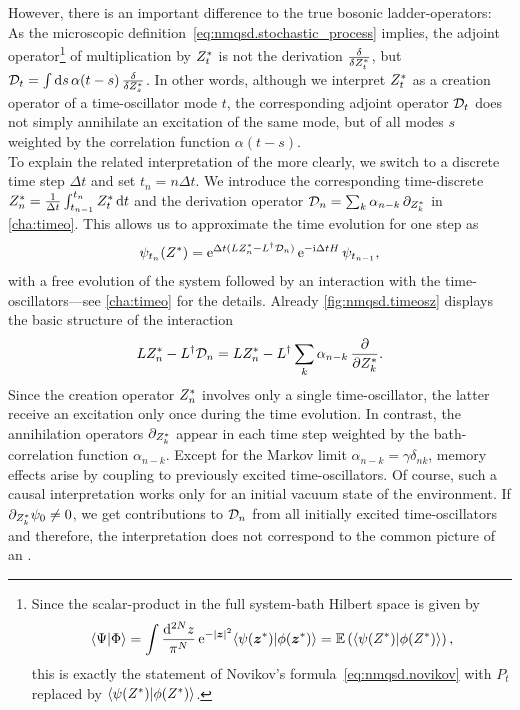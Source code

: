 However, there is an important difference to the true bosonic ladder-operators:
As the microscopic definition~\ref{eq:nmqsd.stochastic_process} implies, the adjoint operator\footnote{%
  Since the scalar-product in the full system-bath Hilbert space is given by
  \begin{equation*}
    \braket{\Psi}{\Phi} = \int \frac{\mathrm{d}^{2N} z}{\pi^N} \, \exp[-\abs{\zz}^2] \braket{\psi(\cc\zz)}{\phi(\cc\zz)} = \E[\braket{\psi(\ZZ)}{\phi(\ZZ)}],
  \end{equation*}
  this is exactly the statement of Novikov's formula~\ref{eq:nmqsd.novikov} with $P_t$ replaced by $\langle \psi({Z}^*) | \phi({Z}^*) \rangle$.
}
of multiplication by ${Z}^*_t$ is not the derivation $\frac{\delta}{\delta {Z}^*_t}$, but $\mathcal{D}_t = \int \mathrm{d}s \, \alpha(t - s) \, \frac{\delta}{\delta {Z}^*_s}$.
In other words, although we interpret ${Z}^*_t$ as a creation operator of a time-oscillator mode $t$, the corresponding adjoint operator $\mathcal{D}_t$ does not simply annihilate an excitation of the same mode, but of all modes $s$ weighted by the correlation function $\alpha(t-s)$.\\



To explain the related interpretation of the \NMSSE more clearly, we switch to a discrete time step $\Delta t$ and set $t_n = n \Delta t$.
We introduce the corresponding time-discrete  ${Z}^*_n = \frac{1}{\Delta t} \int_{t_{n-1}}^{t_n} {Z}^*_t \, \mathrm{d} t$ and the derivation operator $\mathcal{D}_n = \sum_k \alpha_{n-k} \, \partial_{{Z}^*_k}$ in \autoref{cha:timeo}.
This allows us to approximate the time evolution for one step as
\begin{align*}
  \psi_{t_n}(\ZZ) = \exp[\Delta t (L \ZZ_n - \adj{L} \adjZZ_n)] \, \exp[-\ii \Delta t \Hsys] \, \psi_{t_{n-1}},
\end{align*}
with a free evolution of the system followed by an interaction with the time-oscillators---see \autoref{cha:timeo} for the details.
Already \autoref{fig:nmqsd.timeosz} displays the basic structure of the interaction
\begin{equation*}
  L {Z}^*_n - L^\dagger \mathcal{D}_n = L {Z}^*_n - L^\dagger \sum_k \alpha_{n - k} \, \frac{\partial}{\partial {Z}^*_k}.
\end{equation*}
Since the creation operator ${Z}^*_n$ involves only a single time-oscillator, the latter receive an excitation only once during the time evolution.
In contrast, the annihilation operators $\partial_{{Z}^*_k}$ appear in each time step weighted by the bath-correlation function $\alpha_{n-k}$.
Except for the Markov limit $\alpha_{n-k} = \gamma\delta_{nk}$, memory effects arise by coupling to previously excited time-oscillators.
Of course, such a causal interpretation works only for an initial vacuum state of the environment.
If $\partial_{{Z}^*_k} \psi_0 \neq 0$, we get contributions to $\mathcal{D}_n$ from all initially excited time-oscillators and therefore, the interpretation does not correspond to the common picture of an .


